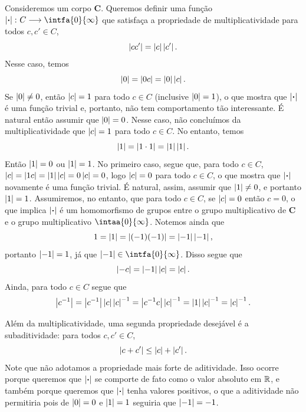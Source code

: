 Consideremos um corpo $\bm C$. Queremos definir uma função $\abs{\var}\colon C \to \intfa{0}{\infty}$ que satisfaça a propriedade de multiplicatividade para todos $c,c' \in C$,
	\begin{equation*}
	\left\vert{cc'}\right\vert = \left\vert{c}\right\vert\left\vert{c'}\right\vert.
	\end{equation*}
Nesse caso, temos
	\begin{equation*}
	\left\vert{0}\right\vert=\left\vert{0c}\right\vert = \left\vert{0}\right\vert\left\vert{c}\right\vert.
	\end{equation*}
Se $\left\vert{0}\right\vert \neq 0$, então $\left\vert{c}\right\vert=1$ para todo $c \in C$ (inclusive $\left\vert{0}\right\vert=1$), o que mostra que $\left\vert{\bm{\cdot}}\right\vert$ é uma função trivial e, portanto, não tem comportamento tão interessante. É natural então assumir que $\left\vert{0}\right\vert=0$. Nesse caso, não concluímos da multiplicatividade que $\left\vert{c}\right\vert=1$ para todo $c \in C$. No entanto, temos
	\begin{equation*}
	\left\vert{1}\right\vert = \left\vert{1 \cdot 1}\right\vert = \left\vert{1}\right\vert\left\vert{1}\right\vert.
	\end{equation*}
Então $\left\vert{1}\right\vert=0$ ou $\left\vert{1}\right\vert=1$. No primeiro caso, segue que, para todo $c \in C$, $\left\vert{c}\right\vert = \left\vert{1c}\right\vert = \left\vert{1}\right\vert\left\vert{c}\right\vert = 0 \left\vert{c}\right\vert = 0$, logo $\left\vert{c}\right\vert = 0$ para todo $c \in C$, o que mostra que $\left\vert{\bm{\cdot}}\right\vert$ novamente é uma função trivial. É natural, assim, assumir que $\left\vert{1}\right\vert \neq 0$, e portanto $\left\vert{1}\right\vert=1$. Assumiremos, no entanto, que para todo $c \in C$, se $\left\vert{c}\right\vert = 0$ então $c=0$, o que implica $\left\vert{\bm{\cdot}}\right\vert$ é um homomorfismo de grupos entre o grupo multiplicativo de $\bm C$ e o grupo multiplicativo $\intaa{0}{\infty}$.
Notemos ainda que
	\begin{equation*}
	1 = \left\vert{1}\right\vert = \left\vert{(-1)(-1)}\right\vert = \left\vert{-1}\right\vert\left\vert{-1}\right\vert,
	\end{equation*}
portanto $\left\vert{-1}\right\vert = 1$, já que $\abs{-1} \in \intfa{0}{\infty}$. Disso segue que
	\begin{equation*}
	\left\vert{-c}\right\vert = \left\vert{-1}\right\vert\left\vert{c}\right\vert=\left\vert{c}\right\vert.
	\end{equation*}
Ainda, para todo $c \in C$ segue que
	\begin{equation*}
	\left\vert{c^{-1}}\right\vert = \left\vert{c^{-1}}\right\vert\left\vert{c}\right\vert\left\vert{c}\right\vert^{-1} = \left\vert{c^{-1}c}\right\vert\left\vert{c}\right\vert^{-1} = \left\vert{1}\right\vert\left\vert{c}\right\vert^{-1} = \left\vert{c}\right\vert^{-1}.
	\end{equation*}

Além da multiplicatividade, uma segunda propriedade desejável é a subaditividade: para todos $c,c' \in C$,
	\begin{equation*}
	\left\vert{c+c'}\right\vert \leq \left\vert{c}\right\vert + \left\vert{c'}\right\vert.
	\end{equation*}
Note que não adotamos a propriedade mais forte de aditividade. Isso ocorre porque queremos que $\left\vert{\bm{\cdot}}\right\vert$ se comporte de fato como o valor absoluto em $\mathbb{R}$, e também porque queremos que $\left\vert{\bm{\cdot}}\right\vert$ tenha valores positivos, o que a aditividade não permitiria pois de $\left\vert{0}\right\vert=0$ e $\left\vert{1}\right\vert=1$ seguiria que $\left\vert{-1}\right\vert=-1$.



